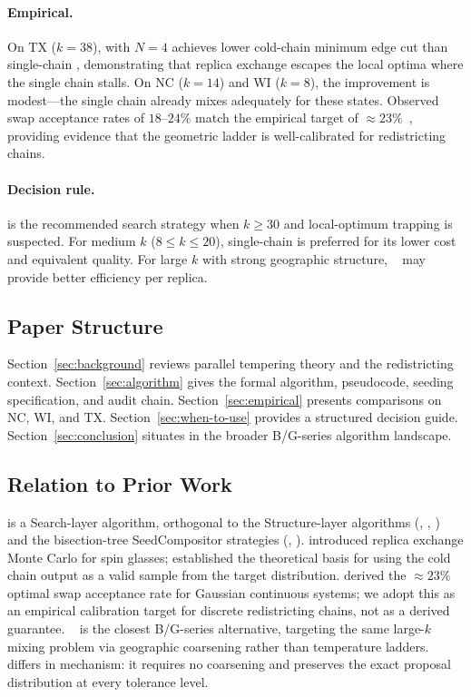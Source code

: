 \paragraph{Empirical.}
On TX ($k=38$), \pt{} with $N=4$ achieves lower cold-chain minimum edge cut
than single-chain \fr{}, demonstrating that replica exchange escapes the local
optima where the single chain stalls.
On NC ($k=14$) and WI ($k=8$), the improvement is modest---the single chain
already mixes adequately for these states.
Observed swap acceptance rates of $18$--$24\%$ match the empirical target of
${\approx}23\%$~\citep{kone2005}, providing evidence that the geometric ladder
is well-calibrated for redistricting chains.

\paragraph{Decision rule.}
\pt{} is the recommended search strategy when $k \ge 30$ and local-optimum
trapping is suspected.
For medium $k$ ($8 \le k \le 20$), single-chain \fr{} is preferred for its
lower cost and equivalent quality.
For large $k$ with strong geographic structure, \ms{}~\citep{dellaLibera2026multiscale}
may provide better efficiency per replica.

\subsection{Paper Structure}

Section~\ref{sec:background} reviews parallel tempering theory and the
redistricting context.
Section~\ref{sec:algorithm} gives the formal algorithm, pseudocode, seeding
specification, and audit chain.
Section~\ref{sec:empirical} presents comparisons on NC, WI, and TX.
Section~\ref{sec:when-to-use} provides a structured decision guide.
Section~\ref{sec:conclusion} situates \pt{} in the broader B/G-series algorithm
landscape.

\subsection{Relation to Prior Work}

\pt{} is a Search-layer algorithm, orthogonal to the Structure-layer algorithms
(\geosec{}, \areasec{}, \sa{}) and the bisection-tree SeedCompositor strategies
(\cs{}, \be{}).
\citet{swendsen1986} introduced replica exchange Monte Carlo for spin glasses;
\citet{geyer1991} established the theoretical basis for using the cold chain
output as a valid sample from the target distribution.
\citet{kone2005} derived the ${\approx}23\%$ optimal swap acceptance rate for
Gaussian continuous systems; we adopt this as an empirical calibration target
for discrete redistricting chains, not as a derived guarantee.
\ms{}~\citep{dellaLibera2026multiscale} is the closest B/G-series alternative,
targeting the same large-$k$ mixing problem via geographic coarsening
rather than temperature ladders.
\pt{} differs in mechanism: it requires no coarsening and preserves the exact
\fr{} proposal distribution at every tolerance level.
